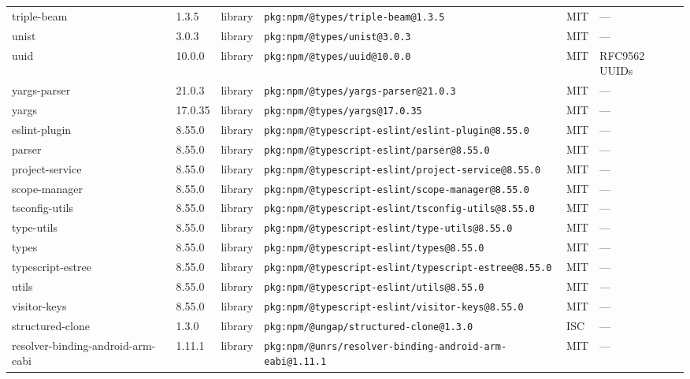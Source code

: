 \documentclass[11pt,a4paper]{article}
\begin{document}
\begin{longtable}{|p{4cm}|p{2cm}|p{1.6cm}|p{5cm}|p{1.5cm}|p{3.5cm}|}
\raggedright triple-beam & 1.3.5 & library & \small\texttt{pkg:npm/@types/triple-beam@1.3.5} & MIT & \small — \\
\raggedright unist & 3.0.3 & library & \small\texttt{pkg:npm/@types/unist@3.0.3} & MIT & \small — \\
\raggedright uuid & 10.0.0 & library & \small\texttt{pkg:npm/@types/uuid@10.0.0} & MIT & \small RFC9562 UUIDs \\
\raggedright yargs-parser & 21.0.3 & library & \small\texttt{pkg:npm/@types/yargs-parser@21.0.3} & MIT & \small — \\
\raggedright yargs & 17.0.35 & library & \small\texttt{pkg:npm/@types/yargs@17.0.35} & MIT & \small — \\
\raggedright eslint-plugin & 8.55.0 & library & \small\texttt{pkg:npm/@typescript-eslint/eslint-plugin@8.55.0} & MIT & \small — \\
\raggedright parser & 8.55.0 & library & \small\texttt{pkg:npm/@typescript-eslint/parser@8.55.0} & MIT & \small — \\
\raggedright project-service & 8.55.0 & library & \small\texttt{pkg:npm/@typescript-eslint/project-service@8.55.0} & MIT & \small — \\
\raggedright scope-manager & 8.55.0 & library & \small\texttt{pkg:npm/@typescript-eslint/scope-manager@8.55.0} & MIT & \small — \\
\raggedright tsconfig-utils & 8.55.0 & library & \small\texttt{pkg:npm/@typescript-eslint/tsconfig-utils@8.55.0} & MIT & \small — \\
\raggedright type-utils & 8.55.0 & library & \small\texttt{pkg:npm/@typescript-eslint/type-utils@8.55.0} & MIT & \small — \\
\raggedright types & 8.55.0 & library & \small\texttt{pkg:npm/@typescript-eslint/types@8.55.0} & MIT & \small — \\
\raggedright typescript-estree & 8.55.0 & library & \small\texttt{pkg:npm/@typescript-eslint/typescript-estree@8.55.0} & MIT & \small — \\
\raggedright utils & 8.55.0 & library & \small\texttt{pkg:npm/@typescript-eslint/utils@8.55.0} & MIT & \small — \\
\raggedright visitor-keys & 8.55.0 & library & \small\texttt{pkg:npm/@typescript-eslint/visitor-keys@8.55.0} & MIT & \small — \\
\raggedright structured-clone & 1.3.0 & library & \small\texttt{pkg:npm/@ungap/structured-clone@1.3.0} & ISC & \small — \\
\raggedright resolver-binding-android-arm-eabi & 1.11.1 & library & \small\texttt{pkg:npm/@unrs/resolver-binding-android-arm-eabi@1.11.1} & MIT & \small — \\

\end{longtable}
\end{document}
